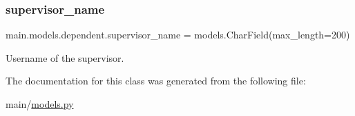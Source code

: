 \mbox{\label{classmain_1_1models_1_1dependent_a2a9f10a83b2253ec10314e4d044f00c0}} 
\subsubsection{\texorpdfstring{supervisor\+\_\+name}{supervisor\_name}}
{\footnotesize\ttfamily main.\+models.\+dependent.\+supervisor\+\_\+name = models.\+Char\+Field(max\+\_\+length=200)\hspace{0.3cm}{\ttfamily [static]}}



Username of the supervisor. 



The documentation for this class was generated from the following file\+:\begin{DoxyCompactItemize}
\item 
main/\hyperlink{models_8py}{models.\+py}\end{DoxyCompactItemize}
